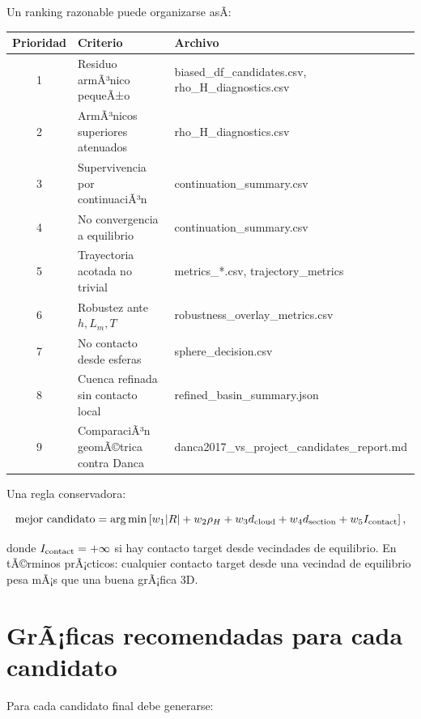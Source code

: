 \documentclass[11pt]{article}
\DeclareRobustCommand{\codepath}[1]{\begingroup\Urlmuskip=0mu plus 2mu\path{#1}\endgroup}
\def\codepath#1{#1}%
\begin{document}
Un ranking razonable puede organizarse asÃ­:

\begin{center}
\small
\begin{tabular}{@{}cL{0.42\textwidth}L{0.36\textwidth}@{}}
\toprule
Prioridad & Criterio & Archivo\\
 & Residuo armÃ³nico pequeÃ±o & \codepath{biased_df_candidates.csv}, \codepath{rho_H_diagnostics.csv}\\
2 & ArmÃ³nicos superiores atenuados & \codepath{rho_H_diagnostics.csv}\\
3 & Supervivencia por continuaciÃ³n & \codepath{continuation_summary.csv}\\
4 & No convergencia a equilibrio & \codepath{continuation_summary.csv}\\
5 & Trayectoria acotada no trivial & \codepath{metrics_*.csv}, \codepath{trajectory_metrics}\\
6 & Robustez ante \(h,L_m,T\) & \codepath{robustness_overlay_metrics.csv}\\
7 & No contacto desde esferas & \codepath{sphere_decision.csv}\\
8 & Cuenca refinada sin contacto local & \codepath{refined_basin_summary.json}\\
9 & ComparaciÃ³n geomÃ©trica contra Danca & \codepath{danca2017_vs_project_candidates_report.md}\\
\bottomrule
\end{tabular}
\end{center}

Una regla conservadora:

\begin{equation}
\text{mejor candidato}
=
\arg\min
\left[
w_1|R|+
w_2\rho_H+
w_3d_{\rm cloud}+
w_4d_{\rm section}
+
w_5 I_{\rm contact}
\right],
\end{equation}

donde \(I_{\rm contact}=+\infty\) si hay contacto target desde vecindades de equilibrio. En tÃ©rminos prÃ¡cticos: cualquier contacto target desde una vecindad de equilibrio pesa mÃ¡s que una buena grÃ¡fica 3D.

\section{GrÃ¡ficas recomendadas para cada candidato}

Para cada candidato final debe generarse:
\end{document}
